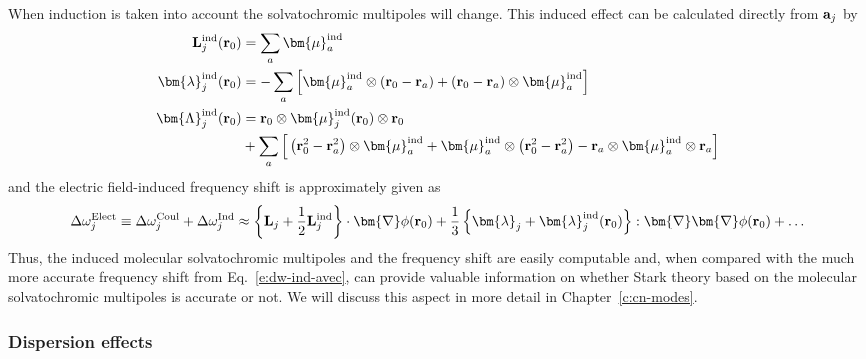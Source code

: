 \documentclass[a4paper,titlepage,twoside,fleqn,12pt]{book}
\newcommand{\BM}[1]{\bm{#1}}
\begin{document}
\begin{refsection}
When induction is taken into account the solvatochromic multipoles
will change. This induced effect can be calculated directly from
${\bf a}_j$ by
%
\begin{subequations}
\begin{align}
{\bf L}_j^{\rm ind}({\bf r}_0)       &=   \sum_a {\BM \mu}_a^{\rm ind} \label{e:34e1} \\
{\BM \lambda}_j^{\rm ind}({\bf r}_0) &= - \sum_a \Big[ {\BM \mu}_a^{\rm ind} \otimes \left( {\bf r}_0 
                                       - {\bf r}_a \right) + \left( {\bf r}_0 
                                       - {\bf r}_a \right) \otimes {\BM \mu}_a^{\rm ind} \Big] \label{e:34e2} \\
{\BM \Lambda}_j^{\rm ind}({\bf r}_0) &=   {\bf r}_0 \otimes {\BM \mu}_j^{\rm ind}({\bf r}_0) \otimes {\bf r}_0 \nonumber \\ 
                                    &  + \sum_a \Big[ \left( {\bf r}_0^2 - {\bf r}_a^2 \right) \otimes {\BM \mu}_a^{\rm ind} 
                                       + {\BM \mu}_a^{\rm ind} \otimes \left( {\bf r}_0^2 - {\bf r}_a^2 \right) 
                                       - {\bf r}_a \otimes {\BM \mu}_a^{\rm ind} \otimes {\bf r}_a \Big] \label{e:34e3}
\end{align}
\end{subequations}
%
and the electric field\hyp{}induced frequency shift 
is approximately given as
%
\begin{equation} \label{e:dmtp-solmmm-ind}
 \Delta\omega_j^{\rm Elect} \equiv  \Delta\omega_j^{\rm Coul} +  \Delta\omega_j^{\rm Ind} \approx  
                       \left\{ {\bf L}_j + \frac{1}{2} {\bf L}_j^{\rm ind} \right\} 
                       \cdot {\BM \nabla} \phi({\bf r}_0)   + 
      \frac{1}{3} \left\{ {\BM \lambda}_j + {\BM \lambda}_j^{\rm ind}({\bf r}_0) \right\} 
                           : {\BM \nabla}  {\BM \nabla} \phi({\bf r}_0)   +   \ldots
\end{equation}
%
Thus, the induced molecular solvatochromic multipoles and the frequency shift
are easily computable and, when compared with the much more accurate
frequency shift from Eq.~\eqref{e:dw-ind-avec}, can provide valuable 
information on whether Stark theory based on the molecular
solvatochromic multipoles is accurate or not. We will discuss 
this aspect in more detail in Chapter~\ref{c:cn-modes}.

\subsubsection{Dispersion effects\label{s:disp}}


\end{refsection}
\end{document}
